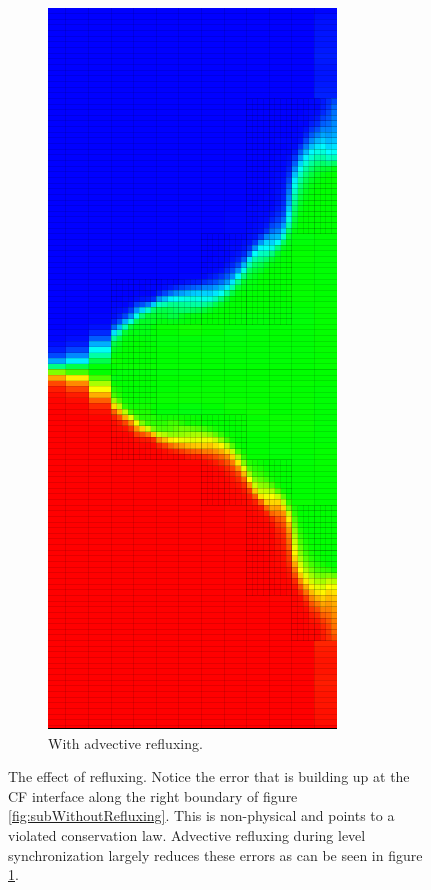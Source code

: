 \documentclass[12pt]{article}
\begin{document}
\begin{figure}
\begin{subfigure}{.5\textwidth}
  \centering
  \includegraphics[width=.75\linewidth]{AdvectiveRefluxFixCropped.png}
  \caption{With advective refluxing.}
  \label{fig:subWithRefluxing}
\end{subfigure}
\caption{The effect of refluxing. Notice the error that is building up at the CF interface along the right boundary of figure \ref{fig:subWithoutRefluxing}. This is non-physical and points to a violated conservation law. Advective refluxing during level synchronization largely reduces these errors as can be seen in figure \ref{fig:subWithRefluxing}. }
\label{fig:AdvectiveRefluxingEffect}
\end{figure}
\end{document}
